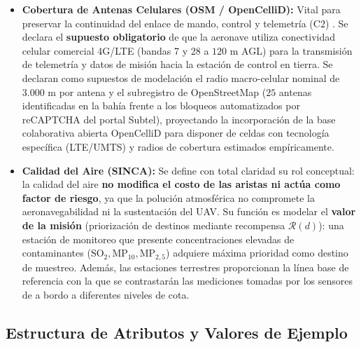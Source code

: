 \documentclass[letterpaper,12pt]{article}
\begin{document}
\begin{itemize}
\begin{enumerate}
        \item \textit{Consumo energético ($EEE$):} Cada metro de ascenso vertical exige un incremento exponencial en la potencia suministrada por los rotores para vencer la fuerza gravitatoria. Por esta razón, el sistema no almacena una cota puntual estática por nodo, sino el perfil altimétrico discretizado cada $100\text{ m}$ a lo largo de cada arista (\texttt{terrain\_mean\_m}, \texttt{ascent\_m}, \texttt{descent\_m}, \texttt{slope\_max\_pct}), insumo indispensable para modelar el gasto de batería ($EEE$) según la formulación física de Kosior et al. \cite{kosior}.
    \end{enumerate}
    \item \textbf{Cobertura de Antenas Celulares (OSM / OpenCelliD):} Vital para preservar la continuidad del enlace de mando, control y telemetría (C2) \cite{petritoli}. Se declara el \textbf{supuesto obligatorio} de que la aeronave utiliza conectividad celular comercial 4G/LTE (bandas 7 y 28 a $120\text{ m}$ AGL) para la transmisión de telemetría y datos de misión hacia la estación de control en tierra. Se declaran como supuestos de modelación el radio macro-celular nominal de $3.000\text{ m}$ por antena y el subregistro de OpenStreetMap ($25$ antenas identificadas en la bahía frente a los bloqueos automatizados por reCAPTCHA del portal Subtel), proyectando la incorporación de la base colaborativa abierta OpenCelliD para disponer de celdas con tecnología específica (LTE/UMTS) y radios de cobertura estimados empíricamente.
    \item \textbf{Calidad del Aire (SINCA):} Se define con total claridad su rol conceptual: la calidad del aire \textbf{no modifica el costo de las aristas ni actúa como factor de riesgo}, ya que la polución atmosférica no compromete la aeronavegabilidad ni la sustentación del UAV. Su función es modelar el \textbf{valor de la misión} (priorización de destinos mediante recompensa $\mathcal{R}(d)$): una estación de monitoreo que presente concentraciones elevadas de contaminantes ($\text{SO}_2, \text{MP}_{10}, \text{MP}_{2{,}5}$) adquiere máxima prioridad como destino de muestreo. Además, las estaciones terrestres proporcionan la línea base de referencia con la que se contrastarán las mediciones tomadas por los sensores de a bordo a diferentes niveles de cota.
\end{itemize}

\subsection{Estructura de Atributos y Valores de Ejemplo}
\label{subsec:metadata_json}
\end{document}

